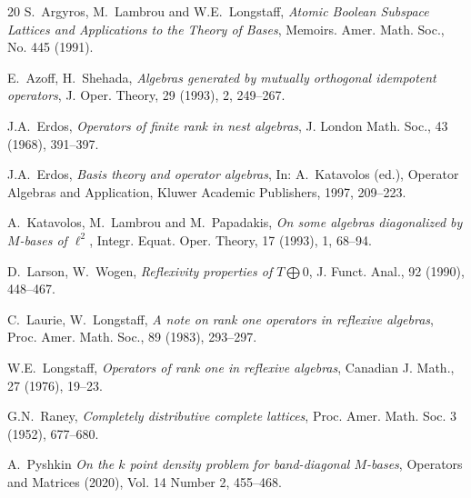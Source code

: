 \documentclass[12pt,oneside,a4paper]{amsart}
\begin{document}
\begin {thebibliography}{20}
    S.~\!Argyros, M.~\!Lambrou and W.E.~\!Longstaff,
    \emph{Atomic Boolean Subspace Lattices and Applications to the Theory of Bases},
    Memoirs. Amer. Math. Soc., No. 445 (1991).

    E.~\!Azoff, H.~\!Shehada,
    \emph{Algebras generated by mutually orthogonal idempotent operators},
    J. Oper. Theory, 29 (1993), 2, 249--267.




    J.A.~\!Erdos,
    \emph{Operators of finite rank in nest algebras},
    J. London Math. Soc., 43 (1968), 391--397.

    J.A.~\!Erdos,
    \emph{Basis theory and operator algebras},
    In: A.~\!Katavolos (ed.), Operator Algebras and Application, Kluwer Academic Publishers, 1997, 209--223.

    A.~\!Katavolos, M.~\!Lambrou and M.~\!Papadakis,
    \emph{On some algebras diagonalized by $M$-bases of $\ell^2$},
    Integr. Equat. Oper. Theory, 17 (1993), 1, 68--94.

    D.~\!Larson, W.~\!Wogen,
    \emph{Reflexivity properties of $T\bigoplus0$},
    J. Funct. Anal., 92 (1990), 448--467.

    C.~\!Laurie, W.~\!Longstaff,
    \emph{A note on rank one operators in reflexive algebras},
    Proc. Amer. Math. Soc., 89 (1983), 293--297.

    W.E.~\!Longstaff,
    \emph{Operators of rank one in reflexive algebras},
    Canadian J. Math., 27 (1976), 19--23.

    G.N.~\!Raney,
    \emph{Completely distributive complete lattices},
    Proc. Amer. Math. Soc. 3 (1952), 677--680.

    A.~\!Pyshkin
    \emph{On the $k$ point density problem for band-diagonal $M$-bases},
    Operators and Matrices (2020), Vol. 14 Number 2, 455--468.


\end{thebibliography}
\end{document}
